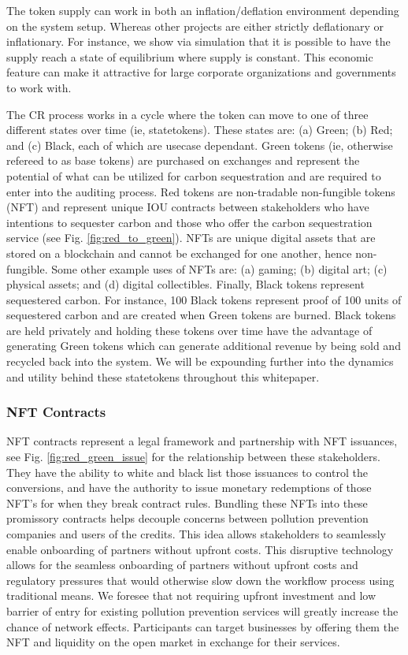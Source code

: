 \documentclass{article}
\begin{document}
The token supply can work in both an inflation/deflation environment depending on the system setup. Whereas other projects are either strictly deflationary or inflationary. For instance, we show via simulation that it is possible to have the supply reach a state of equilibrium where supply is constant.  This economic feature can make it attractive for large corporate organizations and governments to work with.

The CR process works in a cycle where the token can move to one of three different states over time (ie, statetokens). These states are: (a) Green; (b) Red; and (c) Black, each of which are usecase dependant. Green tokens (ie,  otherwise refereed to as base tokens) are purchased on exchanges and represent the potential of what can be utilized for carbon sequestration and are required to enter into the auditing process. Red tokens are non-tradable non-fungible tokens (NFT) and represent unique IOU contracts between stakeholders who have intentions to sequester carbon and those who offer the carbon sequestration service (see Fig. \ref{fig:red_to_green}). NFTs are unique digital assets that are stored on a blockchain and cannot be exchanged for one another, hence non-fungible. Some other example uses of NFTs are: (a) gaming; (b) digital art; (c) physical assets; and (d) digital collectibles.  Finally, Black tokens represent sequestered carbon. For instance, 100 Black tokens represent proof of 100 units of sequestered carbon and are created when Green tokens are burned. Black tokens are held privately and holding these tokens over time have the advantage of generating Green tokens which can generate additional revenue by being sold and recycled back into the system. We will be expounding further into the dynamics and utility behind these statetokens throughout this whitepaper.
 
\subsubsection{NFT Contracts}
\label{section:nft_tokens}

NFT contracts represent a legal framework and partnership with NFT issuances, see Fig. \ref{fig:red_green_issue} for the relationship between these stakeholders. They have the ability to white and black list those issuances to control the conversions, and have the authority to issue monetary redemptions of those NFT’s for when they break contract rules. Bundling these NFTs into these promissory contracts helps decouple concerns between pollution prevention companies and users of the credits. This idea allows stakeholders to seamlessly enable onboarding of partners without upfront costs. This disruptive technology allows for the seamless onboarding of partners without upfront costs and regulatory pressures that would otherwise slow down the workflow process using traditional means. We foresee that not requiring upfront investment and low barrier of entry for existing pollution prevention services will greatly increase the chance of network effects. Participants can target businesses by offering them the NFT and liquidity on the open market in exchange for their services. 
\end{document}
